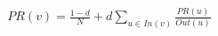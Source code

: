 \documentclass[preview]{standalone}
\begin{document}
\begin{align*}
PR(v) = \frac{1-d}{N} + d \sum_{u \in In(v)} \frac{PR(u)}{Out(u)}
\end{align*}
\end{document}
